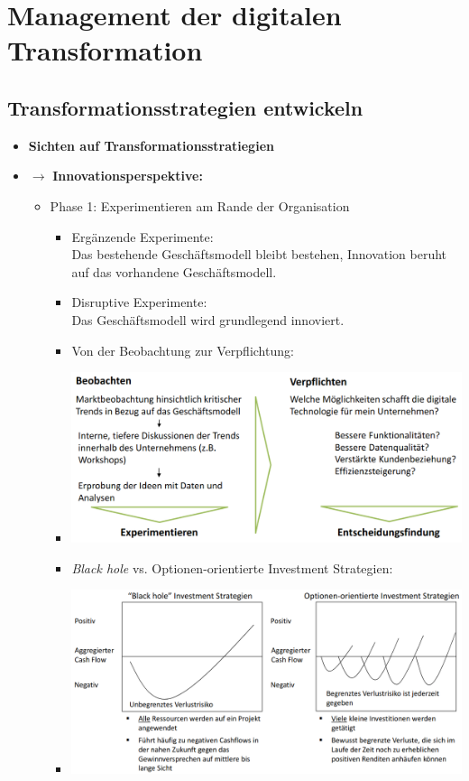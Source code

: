 \documentclass[12pt,a4paper]{article}
\author{Pauline Speckmann}
\begin{document}
\setcounter{section}{4}
\section{Management der digitalen Transformation}


\vspace*{1cm}
\subsection{Transformationsstrategien entwickeln} %

\begin{itemize}
   \item \textbf{Sichten auf Transformationsstratiegien}

   \item[] $\rightarrow$ \textbf{Innovationsperspektive:}
      \begin{itemize}
         \item Phase 1: Experimentieren am Rande der Organisation
               \begin{itemize}
                  \item Ergänzende Experimente: \\
                        Das bestehende Geschäftsmodell bleibt bestehen, Innovation beruht auf das vorhandene Geschäftsmodell.
                  \item Disruptive Experimente: \\
                        Das Geschäftsmodell wird grundlegend innoviert.
                  \item Von der Beobachtung zur Verpflichtung:
                  \item[] \includegraphics[scale=0.45]{experiment.png}
                  \item \emph{Black hole} vs. Optionen-orientierte Investment Strategien:
                  \item[] \includegraphics[scale=0.4]{bh.png}

\end{itemize}
\end{itemize}
\end{itemize}
\end{document}
